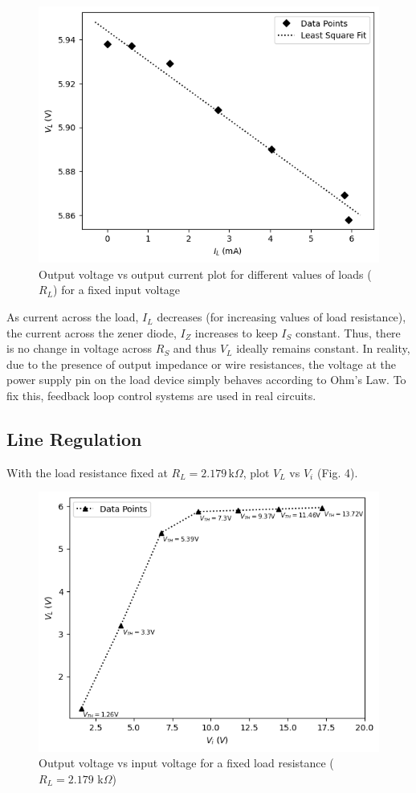    \begin{figure}[H]
        \centering
        \includegraphics[width=0.8\columnwidth]{images/g2.png}
        \caption{Output voltage vs output current plot for different values of loads ($R_L$) for a fixed input voltage}
        \label{fig:2}
    \end{figure}

    As current across the load, $I_L$ decreases (for increasing values of load resistance), the current across the zener diode, $I_Z$ increases to keep $I_S$ constant. Thus, there is no change in voltage across $R_S$ and thus $V_L$ ideally remains constant. In reality,  due to the presence of output impedance or wire resistances, the voltage at the power supply pin on the load device simply behaves according to Ohm’s Law. To fix this, feedback loop control systems are used in real circuits.

\subsection*{Line Regulation}
    With the load resistance fixed at $R_L = 2.179\,\text{k}\Omega$, plot $V_L$ vs $V_i$ (Fig. 4). 

    \begin{figure}
        \centering
        \includegraphics[width=0.9\columnwidth]{images/g3.png}
        \caption{Output voltage vs input voltage for a fixed load resistance ($R_L=2.179$ k$\Omega$)}
        \label{fig:3}
    \end{figure}

